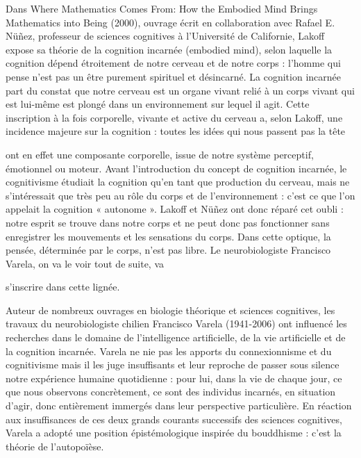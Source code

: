 Dans Where Mathematics Comes From: How the Embodied Mind Brings Mathematics into Being (2000), ouvrage écrit en collaboration avec Rafael E. Nüñez, professeur de sciences cognitives à l’Université de Californie, Lakoff expose sa théorie de la cognition incarnée (embodied mind), selon laquelle la cognition dépend étroitement de notre cerveau et de notre corps : l’homme qui pense n’est pas un être purement spirituel et désincarné. La cognition incarnée part du constat que notre cerveau est un organe vivant relié à un corps vivant qui est lui-même est plongé dans un environnement sur lequel il agit. Cette inscription à la fois corporelle, vivante et active du cerveau a, selon Lakoff, une incidence majeure sur la cognition : toutes les idées qui nous passent pas la tête\par

ont en effet une composante corporelle, issue de notre système perceptif, émotionnel ou moteur. Avant l'introduction du concept de cognition incarnée, le cognitivisme étudiait la cognition qu’en tant que production du cerveau, mais ne s’intéressait que très peu au rôle du corps et de l’environnement : c’est ce que l’on appelait la cognition « autonome ». Lakoff et Nüñez ont donc réparé cet oubli : notre esprit se trouve dans notre corps et ne peut donc pas fonctionner sans enregistrer les mouvements et les sensations du corps. Dans cette optique, la pensée, déterminée par le corps, n’est pas libre. Le neurobiologiste Francisco Varela, on va le voir tout de suite, va\par


s’inscrire dans cette lignée.\par


Auteur de nombreux ouvrages en biologie théorique et sciences cognitives, les travaux du neurobiologiste chilien Francisco Varela (1941-2006) ont influencé les recherches dans le domaine de l’intelligence artificielle, de la vie artificielle et de la cognition incarnée. Varela ne nie pas les apports du connexionnisme et du cognitivisme mais il les juge insuffisants et leur reproche de passer sous silence notre expérience humaine quotidienne : pour lui, dans la vie de chaque jour, ce que nous observons concrètement, ce sont des individus incarnés, en situation d’agir, donc entièrement immergés dans leur perspective particulière. En réaction aux insuffisances de ces deux grands courants successifs des sciences cognitives, Varela a adopté une position épistémologique inspirée du bouddhisme : c’est la théorie de l’autopoïèse.\par

